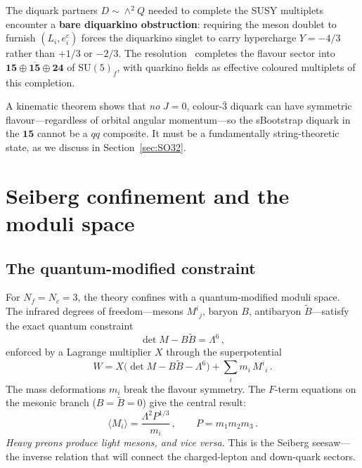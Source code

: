 \documentclass[12pt,a4paper]{article}
\newcommand{\SU}{\mathrm{SU}}
\newcommand{\Nf}{N_{\!f}}
\newcommand{\Nc}{N_{\!c}}
\begin{document}
The diquark partners $D \sim \wedge^2 Q$ needed to complete the
SUSY multiplets encounter a \textbf{bare diquarkino obstruction}:
requiring the meson doublet to furnish $(L_i, e^c_i)$ forces
the diquarkino singlet to carry hypercharge $Y = -4/3$ rather
than $+1/3$ or $-2/3$.
The resolution~\cite{Rivero:2024epjc} completes the flavour
sector into $\mathbf{15} \oplus \overline{\mathbf{15}}
\oplus \mathbf{24}$ of $\SU(5)_f$, with quarkino fields as
effective coloured multiplets of this completion.

A kinematic theorem shows that \emph{no} $J = 0$,
colour-$\bar{3}$ diquark can have symmetric flavour---regardless
of orbital angular momentum---so the sBootstrap diquark in the
$\mathbf{15}$ cannot be a $qq$ composite.
It must be a fundamentally string-theoretic state, as we discuss
in Section~\ref{sec:SO32}.


\section{Seiberg confinement and the moduli space}
\label{sec:seiberg}

\subsection{The quantum-modified constraint}

For $\Nf = \Nc = 3$, the theory confines with a
quantum-modified moduli space.
The infrared degrees of freedom---mesons $M^i{}_j$, baryon $B$,
antibaryon $\tilde{B}$---satisfy the exact quantum constraint
\begin{equation}
  \det M - B\tilde{B} = \Lambda^6\,,
  \label{eq:constraint}
\end{equation}
enforced by a Lagrange multiplier $X$ through the superpotential
\begin{equation}
  W = X\bigl(\det M - B\tilde{B} - \Lambda^6\bigr)
    + \sum_i m_i\,M^i{}_i\,.
  \label{eq:Wtot}
\end{equation}
The mass deformations $m_i$ break the flavour symmetry.
The $F$-term equations on the mesonic branch
($B = \tilde{B} = 0$) give the central result:
\begin{equation}
  \langle M_i \rangle = \frac{\Lambda^2 P^{1/3}}{m_i}\,,
  \qquad P = m_1 m_2 m_3\,.
  \label{eq:vacuum}
\end{equation}
\emph{Heavy preons produce light mesons, and vice versa.}
This is the Seiberg seesaw---the inverse relation that will
connect the charged-lepton and down-quark sectors.
\end{document}
